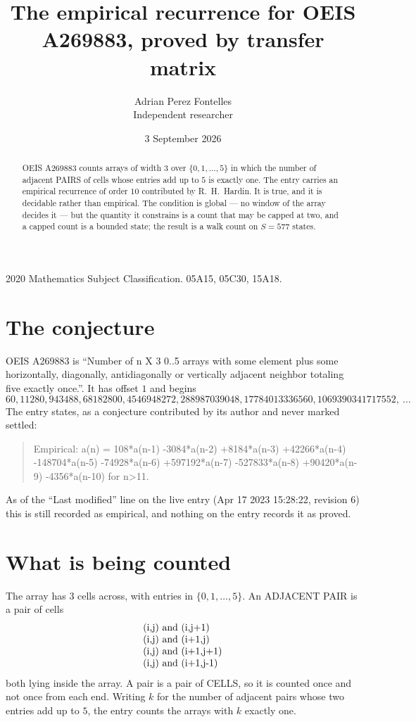 \documentclass[11pt,a4paper]{article}
\title{The empirical recurrence for OEIS A269883, proved by transfer matrix}
\author{Adrian Perez Fontelles\\ \small Independent researcher}
\date{3 September 2026}
\theoremstyle{plain}
\theoremstyle{definition}
\begin{document}
\maketitle

\begin{abstract}
OEIS A269883 counts arrays of width $3$ over $\{0,1,\dots,5\}$ in which the number of adjacent PAIRS of
cells whose entries add up to $5$ is exactly one. The entry carries an empirical recurrence of
order $10$ contributed by R.~H.~Hardin. It is true, and it is decidable rather than
empirical. The condition is global --- no window of the array decides it --- but the quantity
it constrains is a count that may be capped at two, and a capped count is a bounded state; the
result is a walk count on $S=577$ states.
\end{abstract}

\noindent\small 2020 Mathematics Subject Classification. 05A15, 05C30, 15A18.\normalsize

\section{The conjecture}

OEIS A269883 is ``Number of n X 3 0..5 arrays with some element plus some horizontally, diagonally, antidiagonally or vertically adjacent neighbor totaling five exactly once.''. It has offset $1$ and begins
\[
60, 11280, 943488, 68182800, 4546948272, 288987039048, 17784013336560, 1069390341717552,\ \dots
\]
The entry states, as a conjecture contributed by its author and never marked settled:
\begin{quote}
Empirical: a(n) = 108*a(n-1) -3084*a(n-2) +8184*a(n-3) +42266*a(n-4) -148704*a(n-5) -74928*a(n-6) +597192*a(n-7) -527833*a(n-8) +90420*a(n-9) -4356*a(n-10) for n>11.
\end{quote}
As of the ``Last modified'' line on the live entry (Apr 17 2023 15:28:22, revision 6) this is still
recorded as empirical, and nothing on the entry records it as proved.

\section{What is being counted}

The array has $3$ cells across, with entries in $\{0,1,\dots,5\}$. An ADJACENT PAIR is a pair of cells
\[
\begin{array}{l}
$(i,j)\text{ and }(i,j{+}1)$ \\
$(i,j)\text{ and }(i{+}1,j)$ \\
$(i,j)\text{ and }(i{+}1,j{+}1)$ \\
$(i,j)\text{ and }(i{+}1,j{-}1)$ \\
\end{array}
\]
both lying inside the array. A pair is a pair of CELLS, so it is counted once and not once from
each end. Writing $k$ for the number of adjacent pairs whose two entries add up to $5$, the
entry counts the arrays with $k$ exactly one.
\end{document}
